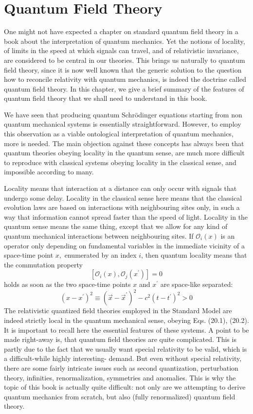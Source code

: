 \documentclass[main.tex]{subfiles}
\begin{document}
\section{Quantum Field Theory}\label{ch20}

One might not have expected a chapter on standard quantum field theory in a book about the interpretation of quantum mechanics. Yet the notions of locality, of limits in the speed at which signals can travel, and of relativistic invariance, are considered to be central in our theories. This brings us naturally to quantum field theory, since it is now well known that the generic solution to the question how to reconcile relativity with quantum mechanics, is indeed the doctrine called quantum field theory. In this chapter, we give a brief summary of the features of quantum field theory that we shall need to understand in this book.

We have seen that producing quantum Schrödinger equations starting from non quantum mechanical systems is essentially straightforward. However, to employ this observation as a viable ontological interpretation of quantum mechanics, more is needed. The main objection against these concepts has always been that quantum theories obeying locality in the quantum sense, are much more difficult to reproduce with classical systems obeying locality in the classical sense, and impossible according to many.

Locality means that interaction at a distance can only occur with signals that undergo some delay. Locality in the classical sense here means that the classical evolution laws are based on interactions with neighbouring sites only, in such a way that information cannot spread faster than the speed of light. Locality in the quantum sense means the same thing, except that we allow for any kind of quantum mechanical interactions between neighbouring sites. If $\mathcal{O}_{i}(x)$ is an operator only depending on fundamental variables in the immediate vicinity of a space-time point $x,$ enumerated by an index $i$, then quantum locality means that the commutation property
$$
\left[\mathcal{O}_{i}(x), \mathcal{O}_{j}\left(x^{\prime}\right)\right]=0
$$
holds as soon as the two space-time points $x$ and $x^{\prime}$ are space-like separated:
$$
\left(x-x^{\prime}\right)^{2} \equiv\left(\vec{x}-\vec{x}^{\prime}\right)^{2}-c^{2}\left(t-t^{\prime}\right)^{2}>0
$$
The relativistic quantized field theories employed in the Standard Model are indeed strictly local in the quantum mechanical sense, obeying Eqs. (20.1), (20.2).
It is important to recall here the essential features of these systems. A point to be made right-away is, that quantum field theories are quite complicated. This is partly due to the fact that we usually want special relativity to be valid, which is a difficult-while highly interesting- demand. But even without special relativity, there are some fairly intricate issues such as second quantization, perturbation theory, infinities, renormalization, symmetries and anomalies. This is why the topic of this book is actually quite difficult: not only are we attempting to derive quantum mechanics from scratch, but also (fully renormalized) quantum field theory.
\end{document}
